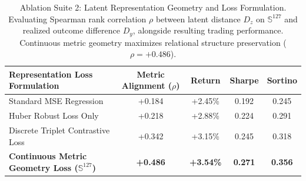 \begin{table}[ht]
\centering
\small
\begin{tabular}{lcccc}
\toprule
\textbf{Representation Loss Formulation} & \textbf{Metric Alignment ($\rho$)} & \textbf{Return} & \textbf{Sharpe} & \textbf{Sortino} \\
\midrule
Standard MSE Regression & +0.184 & +2.45\% & 0.192 & 0.245 \\
Huber Robust Loss Only & +0.218 & +2.88\% & 0.224 & 0.291 \\
Discrete Triplet Contrastive Loss & +0.342 & +3.15\% & 0.245 & 0.318 \\
\textbf{Continuous Metric Geometry Loss ($\mathbb{S}^{127}$)} & \textbf{+0.486} & \textbf{+3.54\%} & \textbf{0.271} & \textbf{0.356} \\
\bottomrule
\end{tabular}
\caption{Ablation Suite 2: Latent Representation Geometry and Loss Formulation. Evaluating Spearman rank correlation $\rho$ between latent distance $D_z$ on $\mathbb{S}^{127}$ and realized outcome difference $D_y$, alongside resulting trading performance. Continuous metric geometry maximizes relational structure preservation ($\rho = +0.486$).}
\label{tab:ablation_suite_2_metric_geometry}
\end{table}

